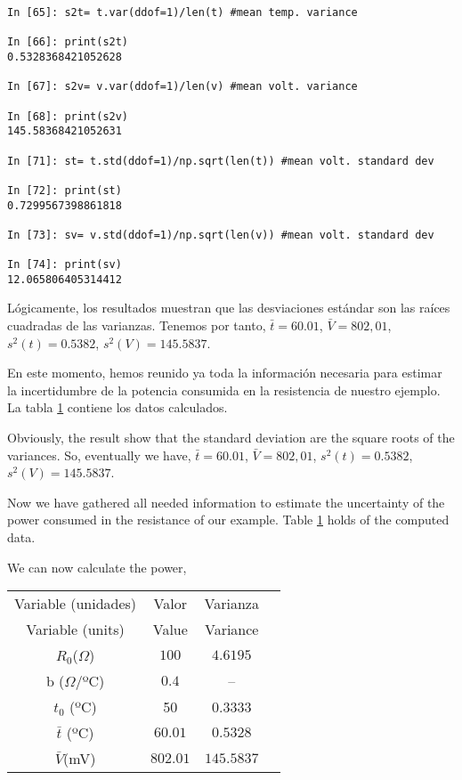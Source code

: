 \begin{center}
	\begin{minipage}{\textwidth}
		\begin{verbatim}
In [65]: s2t= t.var(ddof=1)/len(t) #mean temp. variance

In [66]: print(s2t)
0.5328368421052628

In [67]: s2v= v.var(ddof=1)/len(v) #mean volt. variance

In [68]: print(s2v)
145.58368421052631

In [71]: st= t.std(ddof=1)/np.sqrt(len(t)) #mean volt. standard dev

In [72]: print(st)
0.7299567398861818

In [73]: sv= v.std(ddof=1)/np.sqrt(len(v)) #mean volt. standard dev

In [74]: print(sv)
12.065806405314412
		\end{verbatim}
	\end{minipage}
\end{center} 
\begin{paracol}{2}
Lógicamente, los resultados muestran que las desviaciones estándar son las raíces cuadradas de las varianzas. Tenemos por tanto, $\bar{t}=60.01$, $\bar{V}=802,01$, $s^2(t)=0.5382$, $s^2(V)=145.5837$.
 
En este momento, hemos reunido ya toda la información necesaria para estimar la incertidumbre de la potencia consumida en la resistencia de nuestro ejemplo. La tabla \ref{tabdatos} contiene los datos calculados.

\switchcolumn
Obviously, the result show that the standard deviation are the square roots of the variances. So, eventually we have, $\bar{t}=60.01$, $\bar{V}=802,01$, $s^2(t)=0.5382$, $s^2(V)=145.5837$.

Now we have gathered all needed information to estimate the uncertainty of the power consumed in the resistance of our example. Table \ref{tabdatos} holds of the computed data.

We can now calculate the power,
\end{paracol}

\begin{table}[h]
\label{tabdatos}
\centering
\begin{tabular}{cccc}
\hline
Variable (unidades) & Valor & Varianza  \\
Variable (units) & Value & Variance\\ 
\hline
\hline
$R_0$($\Omega$)&$100$&$4.6195$\\
\hline
b ($\Omega$/ºC)& $0.4$ &--\\
\hline
$t_0$ (ºC)& 50& 0.3333\\
\hline 
 $\bar{t}$ (ºC)&$60.01$&$0.5328$\\
\hline 
$\bar{V}$(mV)& $802.01$&$145.5837$\\
\hline
\hline
\end{tabular}
\end{table}


